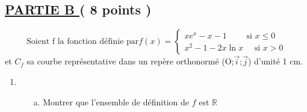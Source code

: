 \documentclass[12pt]{article}
\begin{document}
\subsection*{ \underline{PARTIE B } ( 8 points ) }
\[
\text{Soient f la fonction définie par} 
f(x)=
\begin{cases}
xe^{x}-x-1 \quad\quad  \text{ si }  x \leq 0\\
x^{2}-1-2x\ln x \quad \text{ si } x > 0 
\end{cases}
\]
et $C_{f}$ sa courbe représentative dans un repère orthonormé (O;$\vec{i}$;$\vec{j}$) d'unité 1 cm.
\begin{enumerate}
\item
\begin{enumerate}
\item[a.] Montrer que l'ensemble de définition de $f$ est $\mathbb{R}$
\end{enumerate}
\end{enumerate}
\end{document}
